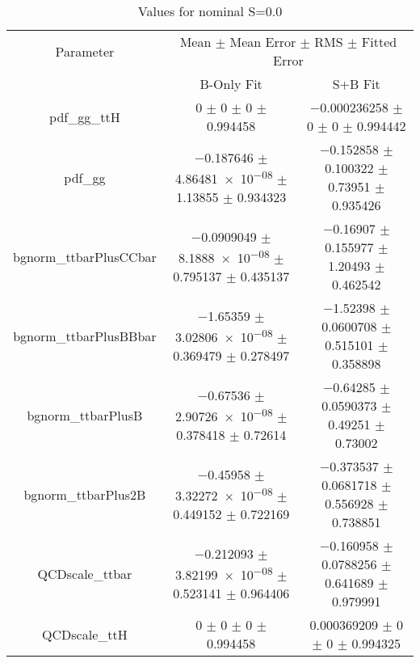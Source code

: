 \begin{table}
\centering
\caption{Values for nominal S=0.0}
\begin{tabular}{ccc}
\toprule
Parameter & \multicolumn{2}{c}{Mean $\pm$ Mean Error $\pm$ RMS $\pm$ Fitted Error}\\
 & B-Only Fit & S+B Fit\\
\midrule
pdf\_gg\_ttH & \num{0} $\pm$ \num{0} $\pm$ \num{0} $\pm$ \num{0.994458} & \num{-0.000236258} $\pm$ \num{0} $\pm$ \num{0} $\pm$ \num{0.994442}\\
pdf\_gg & \num{-0.187646} $\pm$ \num{4.86481e-08} $\pm$ \num{1.13855} $\pm$ \num{0.934323} & \num{-0.152858} $\pm$ \num{0.100322} $\pm$ \num{0.73951} $\pm$ \num{0.935426}\\
bgnorm\_ttbarPlusCCbar & \num{-0.0909049} $\pm$ \num{8.1888e-08} $\pm$ \num{0.795137} $\pm$ \num{0.435137} & \num{-0.16907} $\pm$ \num{0.155977} $\pm$ \num{1.20493} $\pm$ \num{0.462542}\\
bgnorm\_ttbarPlusBBbar & \num{-1.65359} $\pm$ \num{3.02806e-08} $\pm$ \num{0.369479} $\pm$ \num{0.278497} & \num{-1.52398} $\pm$ \num{0.0600708} $\pm$ \num{0.515101} $\pm$ \num{0.358898}\\
bgnorm\_ttbarPlusB & \num{-0.67536} $\pm$ \num{2.90726e-08} $\pm$ \num{0.378418} $\pm$ \num{0.72614} & \num{-0.64285} $\pm$ \num{0.0590373} $\pm$ \num{0.49251} $\pm$ \num{0.73002}\\
bgnorm\_ttbarPlus2B & \num{-0.45958} $\pm$ \num{3.32272e-08} $\pm$ \num{0.449152} $\pm$ \num{0.722169} & \num{-0.373537} $\pm$ \num{0.0681718} $\pm$ \num{0.556928} $\pm$ \num{0.738851}\\
QCDscale\_ttbar & \num{-0.212093} $\pm$ \num{3.82199e-08} $\pm$ \num{0.523141} $\pm$ \num{0.964406} & \num{-0.160958} $\pm$ \num{0.0788256} $\pm$ \num{0.641689} $\pm$ \num{0.979991}\\
QCDscale\_ttH & \num{0} $\pm$ \num{0} $\pm$ \num{0} $\pm$ \num{0.994458} & \num{0.000369209} $\pm$ \num{0} $\pm$ \num{0} $\pm$ \num{0.994325}\\
\bottomrule
\end{tabular}
\end{table}